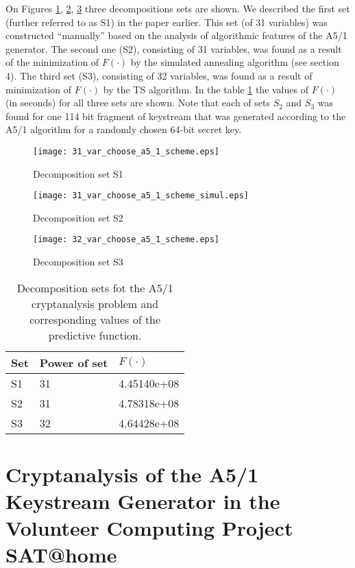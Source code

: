 \documentclass[runningheads,a4paper]{llncs}
\begin{document}
On Figures \ref{a5_1_set_S1}, \ref{a5_1_set_S2}, \ref{a5_1_set_S3} three decompositions sets are shown. We described the first set (further referred to as S1) in the paper \cite{DBLP:conf/pact/SemenovZBP11} earlier. This set (of 31 variables) was constructed ``manually'' based on the analysis of algorithmic features of the A5/1 generator. The second one (S2), consisting of 31 variables, was found as a result of the minimization of $F\left( \cdot \right)$ by the simulated annealing algorithm (see section 4). The third set (S3), consisting of 32 variables, was found as a result of minimization of $F\left( \cdot \right)$ by the TS algorithm. In the table \ref{a5-1_results} the values of $F\left( \cdot \right)$ (in seconds) for all three sets are shown. Note that each of sets $S_2$ and $S_3$ was found for one 114 bit fragment of keystream that was generated according to the A5/1 algorithm for a randomly chosen 64-bit secret key.

\begin{figure}[!ht]
	\centering
		\texttt{[image: 31\_var\_choose\_a5\_1\_scheme.eps]}
	\caption{Decomposition set S1}
	\label{a5_1_set_S1}
\end{figure}

\begin{figure}[!ht]
	\centering
		\texttt{[image: 31\_var\_choose\_a5\_1\_scheme\_simul.eps]}
	\caption{Decomposition set S2}
	\label{a5_1_set_S2}
\end{figure}

\begin{figure}[!ht]
	\centering
		\texttt{[image: 32\_var\_choose\_a5\_1\_scheme.eps]}
	\caption{Decomposition set S3}
	\label{a5_1_set_S3}
\end{figure}

\begin{table}
\caption{Decomposition sets fot the A5/1 cryptanalysis problem and corresponding values of the predictive function. }
\label{a5-1_results}
\centering
\begin{tabular}{p{1.8cm}|p{1.8cm}|p{1.8cm}}
Set & Power of set & $F\left( \cdot \right)$\\
\hline 
\hline
S1 & 31 & 4.45140e+08 \\
\hline 
S2 & 31 & 4.78318e+08 \\
\hline 
S3 & 32 & 4.64428e+08 \\
\end{tabular}
\end{table}

\section{Cryptanalysis of the A5/1 Keystream Generator  in the Volunteer Computing Project SAT@home}
\end{document}
